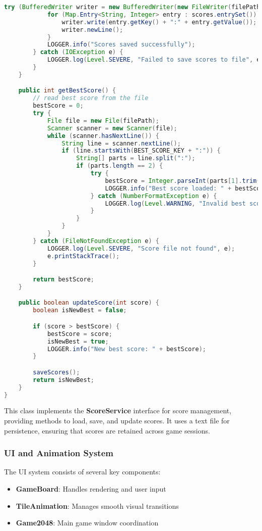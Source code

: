 \documentclass[12pt, a4paper]{article}
\begin{document}
\begin{lstlisting}[language=Java, caption=ScoreManager Class Implementation]
        try (BufferedWriter writer = new BufferedWriter(new FileWriter(filePath))) {
            for (Map.Entry<String, Integer> entry : scores.entrySet()) {
                writer.write(entry.getKey() + ":" + entry.getValue());
                writer.newLine();
            }
            LOGGER.info("Scores saved successfully");
        } catch (IOException e) {
            LOGGER.log(Level.SEVERE, "Failed to save scores to file", e);
        }
    }

    public int getBestScore() {
        // read best score from the file
        bestScore = 0;
        try {
            File file = new File(filePath);
            Scanner scanner = new Scanner(file);
            while (scanner.hasNextLine()) {
                String line = scanner.nextLine();
                if (line.startsWith(BEST_SCORE_KEY + ":")) {
                    String[] parts = line.split(":");
                    if (parts.length == 2) {
                        try {
                            bestScore = Integer.parseInt(parts[1].trim());
                            LOGGER.info("Best score loaded: " + bestScore);
                        } catch (NumberFormatException e) {
                            LOGGER.log(Level.WARNING, "Invalid best score value: " + parts[1], e);
                        }
                    }
                }
            }
        } catch (FileNotFoundException e) {
            LOGGER.log(Level.SEVERE, "Score file not found", e);
            e.printStackTrace();
        }

        return bestScore;
    }

    public boolean updateScore(int score) {
        boolean isNewBest = false;

        if (score > bestScore) {
            bestScore = score;
            isNewBest = true;
            LOGGER.info("New best score: " + bestScore);
        }

        saveScores();
        return isNewBest;
    }
}
\end{lstlisting}
This class implements the \textbf{ScoreService} interface for score management, providing methods to load, save, and update scores. It uses a text file for persistence, ensuring that scores are retained across game sessions.

\subsubsection{UI and Animation System}
The UI system consists of several key components:
\begin{itemize}
    \item \textbf{GameBoard}: Handles rendering and user input
    \item \textbf{TileAnimation}: Manages smooth visual transitions
    \item \textbf{Game2048}: Main game window coordination
\end{itemize}
\end{document}
